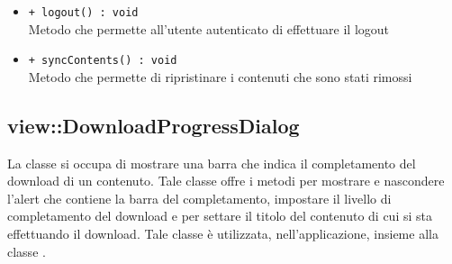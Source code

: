 \documentclass[../Tesi.tex]{subfiles}
\begin{document}
\begin{description}
\begin{itemize}
				\item \texttt{+ logout() : void}\\
				Metodo che permette all'utente autenticato di effettuare il logout

				\item \texttt{+ syncContents() : void}\\
				Metodo che permette di ripristinare i contenuti che sono stati rimossi
			\end{itemize}
		\end{description}

		\subsection{view::DownloadProgressDialog}
		La classe  si occupa di mostrare una barra che indica il completamento del download di un contenuto. Tale classe offre i metodi per mostrare e nascondere l'alert che contiene la barra del completamento, impostare il livello di completamento del download e per settare il titolo del contenuto di cui si sta effettuando il download. Tale classe è utilizzata, nell'applicazione, insieme alla classe .
\end{document}
